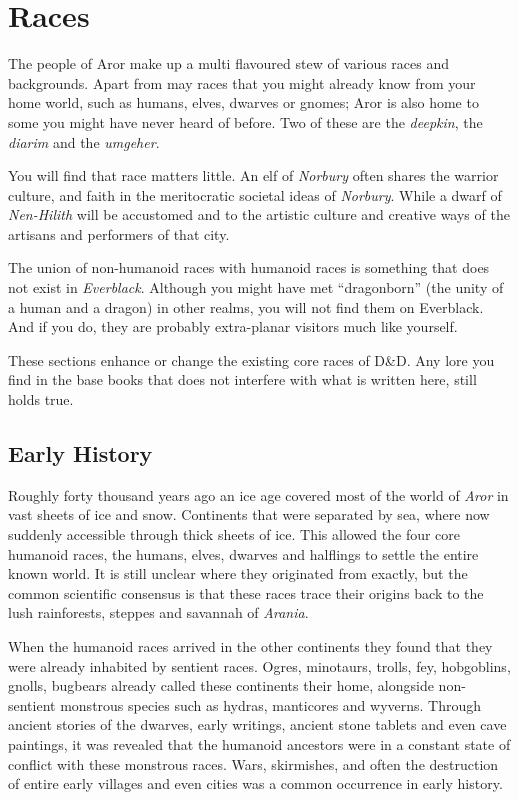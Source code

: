 \twocolumn
\section{Races}

The people of Aror make up a multi flavoured stew of various races and
backgrounds. Apart from may races that you might already know from your
home world, such as humans, elves, dwarves or gnomes; Aror is also home to some
you might have never heard of before. Two of these are the \emph{deepkin}, the
\emph{diarim} and the \emph{umgeher}.

You will find that race matters little. An elf of \emph{Norbury} often shares
the warrior culture, and faith in the meritocratic societal ideas
of \emph{Norbury}. While a dwarf of \emph{Nen-Hilith} will be accustomed and
to the artistic culture and creative ways of the artisans and performers of
that city.

The union of non-humanoid races with humanoid races is something that does
not exist in \emph{Everblack}. Although you might have met ``dragonborn''
(the unity of a human and a dragon) in other realms, you will not find them
on Everblack. And if you do, they are probably extra-planar visitors much
like yourself.

\begin{note}
These sections enhance or change the existing core races of D\&D. Any lore you
find in the base books that does not interfere with what is written here, still
holds true.
\end{note}

\subsection{Early History}

Roughly forty thousand years ago an ice age covered most of the world
of \emph{Aror} in vast sheets of ice and snow. Continents that were separated
by sea, where now suddenly accessible through thick sheets of ice. This
allowed the four core humanoid races, the humans, elves, dwarves and halflings
to settle the entire known world. It is still unclear where they originated
from exactly, but the common scientific consensus is that these races trace
their origins back to the lush rainforests, steppes and savannah
of \emph{Arania}.

When the humanoid races arrived in the other continents they found that they
were already inhabited by sentient races. Ogres, minotaurs, trolls, fey,
hobgoblins, gnolls, bugbears already called these continents their home,
alongside non-sentient monstrous species such as hydras, manticores and
wyverns. Through ancient stories of the dwarves, early writings, ancient stone
tablets and even cave paintings, it was revealed that the humanoid ancestors
were in a constant state of conflict with these monstrous races. Wars,
skirmishes, and often the destruction of entire early villages and even cities
was a common occurrence in early history.

